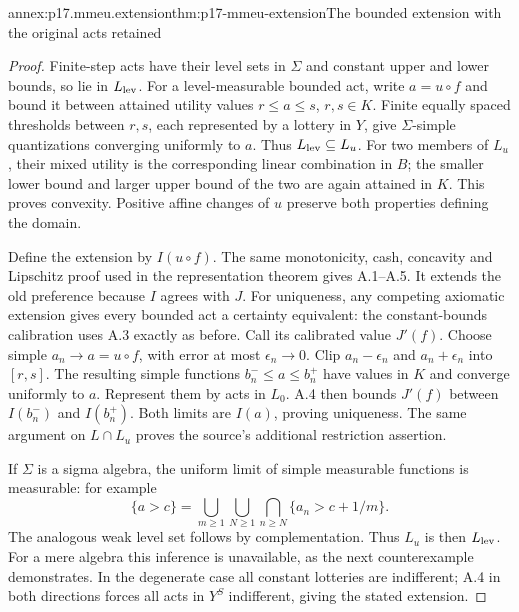 \begin{annexitem}{annex:p17.mmeu.extension}{thm:p17-mmeu-extension}{The bounded extension with the original acts retained}
\begin{proof}
Finite-step acts have their level
sets in \(\Sigma\) and constant
upper and lower bounds, so lie
in \(L_{\rm lev}\).
For a level-measurable bounded act,
write \(a=u\circ f\) and bound
it between attained utility values
\(r\leq a\leq s\), \(r,s\in K\).
Finite equally spaced thresholds
between \(r,s\), each represented
by a lottery in \(Y\), give
\(\Sigma\)-simple quantizations
converging uniformly to \(a\).
Thus \(L_{\rm lev}\subseteq L_u\).
For two members of \(L_u\), their
mixed utility is the corresponding
linear combination in \(B\);
the smaller lower bound and
larger upper bound of the two
are again attained in \(K\).
This proves convexity.
Positive affine changes of \(u\)
preserve both properties defining
the domain.

Define the extension by \(I(u\circ f)\).
The same monotonicity, cash, concavity
and Lipschitz proof used in the
representation theorem gives A.1--A.5.
It extends the old preference
because \(I\) agrees with \(J\).
For uniqueness, any competing
axiomatic extension gives every
bounded act a certainty equivalent:
the constant-bounds calibration
uses A.3 exactly as before.
Call its calibrated value \(J'(f)\).
Choose simple \(a_n\to a=u\circ f\),
with error at most \(\epsilon_n\to0\).
Clip \(a_n-\epsilon_n\) and
\(a_n+\epsilon_n\) into \([r,s]\).
The resulting simple functions
\(b_n^-\leq a\leq b_n^+\)
have values in \(K\) and converge
uniformly to \(a\).
Represent them by acts in \(L_0\).
A.4 then bounds \(J'(f)\)
between \(I(b_n^-)\) and
\(I(b_n^+)\). Both limits are
\(I(a)\), proving uniqueness.
The same argument on \(L\cap L_u\)
proves the source's additional
restriction assertion.

If \(\Sigma\) is a sigma algebra,
the uniform limit of simple measurable
functions is measurable: for example
\[
 \{a>c\}=\bigcup_{m\geq1}\bigcup_{N\geq1}
                   \bigcap_{n\geq N}\{a_n>c+1/m\}.
\]
The analogous weak level set follows
by complementation. Thus \(L_u\)
is then \(L_{\rm lev}\).
For a mere algebra this inference
is unavailable, as the next
counterexample demonstrates.
In the degenerate case all
constant lotteries are indifferent;
A.4 in both directions forces
all acts in \(Y^S\) indifferent,
giving the stated extension.
\end{proof}
\end{annexitem}

